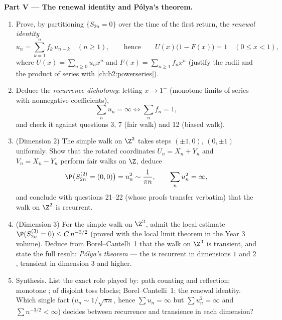 \begin{problem}
\medskip
\noindent\textbf{Part V --- The renewal identity and
P\'olya's theorem.}
\begin{enumerate}[resume]
  \item Prove, by partitioning $\{S_{2n} = 0\}$ over the time
        of the first return, the \emph{renewal identity}
        \[
        u_n = \sum_{k=1}^n f_k\,u_{n-k} \quad (n \geq 1),
        \qquad\text{hence}\qquad
        U(x)\bigl(1 - F(x)\bigr) = 1 \quad (0 \leq x < 1),
        \]
        where $U(x) = \sum_{n\geq0}u_nx^n$ and $F(x) =
        \sum_{n\geq1}f_nx^n$ (justify the radii and the
        product of series with \cref{ch:b2:powerseries}).
  \item Deduce the \emph{recurrence dichotomy}: letting $x
        \to 1^-$ (monotone limits of series with nonnegative
        coefficients),
        \[
        \sum_n u_n = \infty \iff \sum_n f_n = 1 ,
        \]
        and check it against questions 3, 7 (fair walk) and
        12 (biased walk).
  \item (Dimension $2$) The simple walk on $\Z^2$ takes steps
        $(\pm1, 0)$, $(0, \pm1)$ uniformly. Show that the
        rotated coordinates $U_n = X_n + Y_n$ and $V_n = X_n
        - Y_n$ perform \emph{} fair walks on
        $\Z$, deduce
        \[
        \P\bigl(S^{(2)}_{2n} = (0,0)\bigr) = u_n^2 \sim
        \frac1{\pi n},
        \qquad \sum_n u_n^2 = \infty ,
        \]
        and conclude with questions 21--22 (whose proofs
        transfer verbatim) that the walk on $\Z^2$ is
        recurrent.
  \item (Dimension $3$) For the simple walk on $\Z^3$, admit
        the local estimate $\P(S^{(3)}_{2n} = 0) \leq
        C\,n^{-3/2}$ (proved with the local limit theorem in
        the Year 3 volume). Deduce from Borel--Cantelli~1
        that the walk on $\Z^3$ is transient, and state the
        full result: \emph{P\'olya's theorem} --- the  is recurrent in dimensions $1$ and $2$,
        transient in dimension $3$ and higher.
  \item Synthesis. List the exact role played by: path
        counting and reflection; monotone ;
         of disjoint toss blocks;
        Borel--Cantelli~1; the renewal identity. Which single
         fact ($u_n \sim 1/\sqrt{\pi n}$, hence
        $\sum u_n = \infty$ but $\sum u_n^2 = \infty$ and
        $\sum n^{-3/2} < \infty$) decides between recurrence
        and transience in each dimension?
\end{enumerate}
\end{problem}
